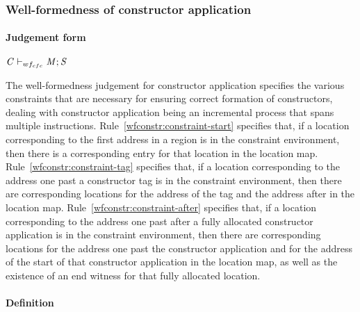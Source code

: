 \subsubsection{Well-formedness of constructor application}
\label{sec:well-formedness-constructors}

\paragraph{Judgement form}

$\mathit{C} \vdash_{wf_{cfc}} \mathit{M};\mathit{S}$

The well-formedness judgement for constructor application specifies the various constraints
that are necessary for ensuring correct formation of constructors, dealing with constructor
application being an incremental process that spans multiple \ourcalc{} instructions.
%
Rule~\ref{wfconstr:constraint-start} specifies that, if a location corresponding to the
first address in a region is in the constraint environment, then there is a corresponding
entry for that location in the location map.
%
Rule~\ref{wfconstr:constraint-tag} specifies that, if a location corresponding to the address one past a constructor
tag is in the constraint environment, then there are corresponding locations for the address
of the tag and the address after in the location map.
%
Rule~\ref{wfconstr:constraint-after} specifies that, if a location corresponding to the address
one past after a fully allocated constructor application is in the constraint environment,
then there are corresponding locations for the address one past the constructor application
and for the address of the start of that constructor application in the location map, as well as the existence
of an end witness for that fully allocated location.

\paragraph{Definition}

